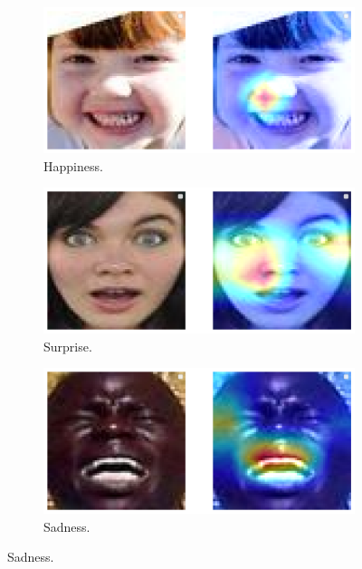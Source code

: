 \begin{figure}[ht]
  \centering
  \begin{subfigure}{0.3\linewidth}
    \includegraphics[width=\linewidth]{xai_happiness_.png}
    \caption{Happiness.}
    \label{fig:xai1}
  \end{subfigure}
  \hfill
  \begin{subfigure}{0.3\linewidth}
    \includegraphics[width=\linewidth]{xai_surprise.png}
    \caption{Surprise.}
    \label{fig:xai2}
  \end{subfigure}
  \hfill
  \begin{subfigure}{0.3\linewidth}
    \includegraphics[width=\linewidth]{xai_sadness_.png}
    \caption{Sadness.}
    \label{fig:xai3}
  \end{subfigure}

\end{figure}
